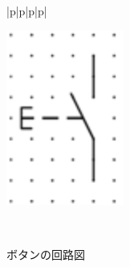 \begin{figure}[H]
\begin{tabular}{|p{\colH}|p{\colI}|p{\colH}|p{\colI}|}
\begin{minipage}[t]{\linewidth}
      \includegraphics[width=\linewidth]{images/chap05/text05-img045.png}
      \caption{ボタンの回路図}
      \smallskip
    \end{minipage}\\ \hline
  \end{tabular}
\end{figure}